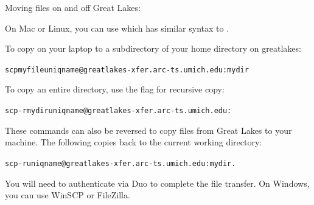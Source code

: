 \begin{frame}{Moving files on and off Great Lakes: }

On Mac or Linux, you can use  which has similar syntax to .

To copy  on your laptop to a subdirectory  of your home directory on greatlakes:
\begin{knitrout}\small
{}\color{fgcolor}\begin{kframe}
\begin{alltt}
scp myfile uniqname@greatlakes-xfer.arc-ts.umich.edu:mydir
\end{alltt}
\end{kframe}
\end{knitrout}
To copy an entire directory, use the  flag for recursive copy:
\begin{knitrout}\small
{}\color{fgcolor}\begin{kframe}
\begin{alltt}
scp -r mydir uniqname@greatlakes-xfer.arc-ts.umich.edu:
\end{alltt}
\end{kframe}
\end{knitrout}
These commands can also be reversed to copy files from Great Lakes to your machine. The following copies  back to the current working directory:
\begin{knitrout}\small
{}\color{fgcolor}\begin{kframe}
\begin{alltt}
scp -r uniqname@greatlakes-xfer.arc-ts.umich.edu:mydir .
\end{alltt}
\end{kframe}
\end{knitrout}
You will need to authenticate via Duo to complete the file transfer.
On Windows, you can use WinSCP or FileZilla. 
\end{frame}

